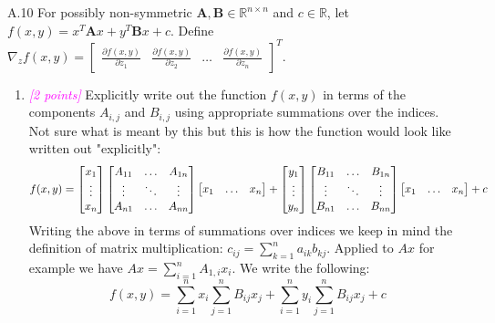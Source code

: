 \documentclass{article}
\newcommand{\field}[1]{\mathbb{#1}}
\newcommand{\1}{\mathbf{1}}
\newcommand{\R}{\field{R}} %
\newcommand{\mat}[1]{\boldsymbol{#1}} %
\newcommand{\points}[1]{\small\textcolor{magenta}{\emph{[#1 points]}} \normalsize}
\begin{document}
\newpage
A.10 For possibly non-symmetric $\mat{A}, \mat{B} \in \R^{n \times n}$ and $c \in \R$, let $f(x, y) = x^T \mat{A} x + y^T \mat{B} x + c$. Define $\nabla_z f(x,y) = \begin{bmatrix} \frac{\partial f(x,y)}{\partial z_1} & \frac{\partial f(x,y)}{\partial z_2} & \dots & \frac{\partial f(x,y)}{\partial z_n} \end{bmatrix}^T$.  
\begin{enumerate}
	\item \points{2} Explicitly write out the function $f(x, y)$ in terms of the components $A_{i,j}$ and $B_{i,j}$ using appropriate summations over the indices.\\
	Not sure what is meant by this but this is how the function would look like written out "explicitly":
	$$
	f(x, y) = 
	\begin{bmatrix} x_1  \\ \vdots \\ x_n \end{bmatrix} \begin{bmatrix} A_{11} & \hdots & A_{1n} \\ \vdots & \ddots & \vdots \\ A_{n1} & \hdots & A_{nn}\end{bmatrix} \begin{bmatrix} x_1  & \hdots & x_n \end{bmatrix} 
	+
	\begin{bmatrix} y_1  \\ \vdots \\ y_n \end{bmatrix} \begin{bmatrix} B_{11} & \hdots & B_{1n} \\ \vdots & \ddots & \vdots \\ B_{n1} & \hdots & B_{nn}\end{bmatrix} \begin{bmatrix} x_1  & \hdots & x_n \end{bmatrix} 
	+
	c \\
	$$
	Writing the above in terms of summations over indices we keep in mind the definition of matrix multiplication: $c_{ij} = \sum_{k=1}^n a_{ik}b_{kj}$. Applied to $Ax$ for example we have $Ax=\sum_{i=1}^n A_{1,i}x_i$. We write the following:
	$$ f(x, y) = \sum_{i=1}^n x_i \sum_{j=1}^n B_{ij}x_j + \sum_{i=1}^n y_i \sum_{j=1}^n B_{ij}x_j + c$$
	

\end{enumerate}
\end{document}
